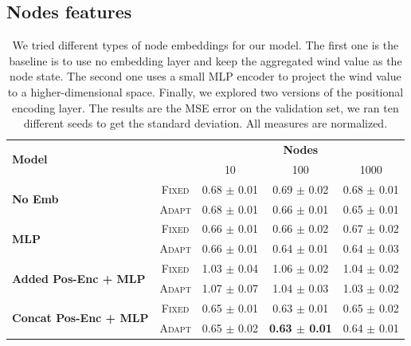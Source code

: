 \documentclass[a4paper,10pt]{article}
\begin{document}
\subsection{Nodes features}

\begin{table}
  \label{tab:nodes}
  \centering
  \begin{tabular}{lcccc} \toprule
    \multirow{2}{*}{\textbf{Model}}                &                            & \multicolumn{3}{c}{\textbf{Nodes}}                                                          \\ \cmidrule(lr){3-5}
                                                   &                            & 10                                 & 100                            & 1000                  \\ \hline
    \multirow{2}{*}{\textbf{No Emb}}               & \scriptsize \textsc{Fixed} & 0.68 \tiny $\pm$ 0.01              & 0.69 \tiny $\pm$ 0.02          & 0.68 \tiny $\pm$ 0.01 \\
                                                   & \scriptsize \textsc{Adapt} & 0.68 \tiny $\pm$ 0.01              & 0.66 \tiny $\pm$ 0.01          & 0.65 \tiny $\pm$ 0.01 \\
    \multirow{2}{*}{\textbf{MLP}}                  & \scriptsize \textsc{Fixed} & 0.66 \tiny $\pm$ 0.01              & 0.66 \tiny $\pm$ 0.02          & 0.67 \tiny $\pm$ 0.02 \\
                                                   & \scriptsize \textsc{Adapt} & 0.66 \tiny $\pm$ 0.01              & 0.64 \tiny $\pm$ 0.01          & 0.64 \tiny $\pm$ 0.03 \\
    \multirow{2}{*}{\textbf{Added Pos-Enc + MLP}}  & \scriptsize \textsc{Fixed} & 1.03 \tiny $\pm$ 0.04              & 1.06 \tiny $\pm$ 0.02          & 1.04 \tiny $\pm$ 0.02 \\
                                                   & \scriptsize \textsc{Adapt} & 1.07 \tiny $\pm$ 0.07              & 1.04 \tiny $\pm$ 0.03          & 1.03 \tiny $\pm$ 0.02 \\
    \multirow{2}{*}{\textbf{Concat Pos-Enc + MLP}} & \scriptsize \textsc{Fixed} & 0.65 \tiny $\pm$ 0.01              & 0.63 \tiny $\pm$ 0.01          & 0.65 \tiny $\pm$ 0.02 \\
                                                   & \scriptsize \textsc{Adapt} & 0.65 \tiny $\pm$ 0.02              & \textbf{0.63 \tiny $\pm$ 0.01} & 0.64 \tiny $\pm$ 0.01 \\

    \bottomrule
  \end{tabular}
  \caption{
    We tried different types of node embeddings for our model. The first one is the baseline is to use no embedding layer and keep the aggregated wind value as the node state. The second one uses a small MLP encoder to project the wind value to a higher-dimensional space. Finally, we explored two versions of the positional encoding layer. The results are the MSE error on the validation set, we ran ten different seeds to get the standard deviation. All measures are normalized.
  }
\end{table}
\end{document}
